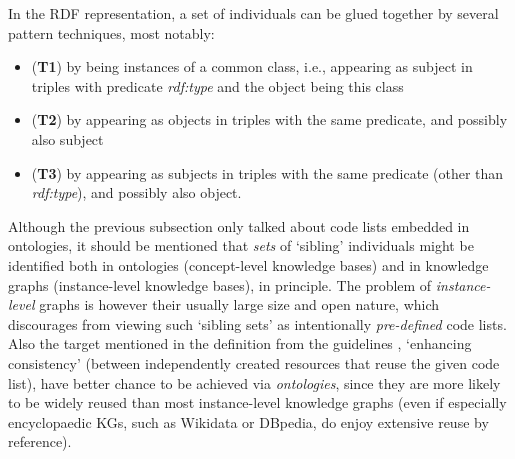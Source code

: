 In the RDF representation, a set of individuals can be glued together by several pattern techniques, most notably:
\begin{itemize}
    \item (\textbf{T1}) by being instances of a common class, i.e., appearing as subject in triples with predicate \emph{rdf:type} and the object being this class
    \item (\textbf{T2})  by appearing as objects in triples with the same predicate, and possibly also subject
    \item (\textbf{T3}) by appearing as subjects in triples with the same predicate (other than \emph{rdf:type}), and possibly also object.
\end{itemize}
Although the previous subsection only talked about code lists embedded in ontologies, it should be mentioned that \emph{sets} of `sibling' individuals might be identified both in ontologies (concept-level knowledge bases) and in  knowledge graphs (instance-level knowledge bases), in principle.
The problem of \emph{instance-level} graphs is however their usually large size and open nature, which discourages from viewing such `sibling sets' as intentionally \emph{pre-defined} code lists.
Also the target mentioned in the definition from the guidelines \cite{guide_code_list}, `enhancing consistency' (between independently created resources that reuse the given code list), have better chance to be achieved via \emph{ontologies}, since they are more likely to be widely reused than most instance-level knowledge graphs (even if especially encyclopaedic KGs, such as Wikidata or DBpedia, do enjoy extensive reuse by reference).

